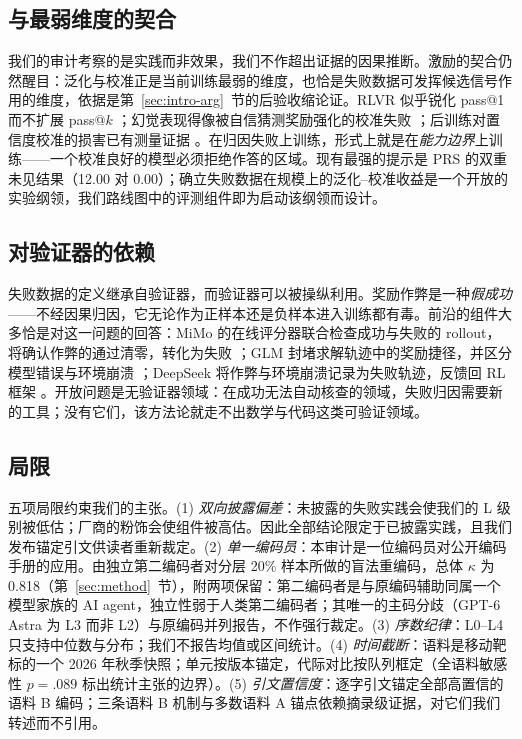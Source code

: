 \documentclass[10pt,fontset=fandol]{ctexart}
\begin{document}
\subsection{与最弱维度的契合}

我们的审计考察的是实践而非效果，我们不作超出证据的因果推断。激励的契合仍然醒目：泛化与校准正是当前训练最弱的维度，也恰是失败数据可发挥候选信号作用的维度，依据是第~\ref{sec:intro-arg}~节的后验收缩论证。RLVR 似乎锐化 pass@1 而不扩展 pass@$k$ \cite{yue2025rlvr}；幻觉表现得像被自信猜测奖励强化的校准失败 \cite{kalai2025halluc}；后训练对置信度校准的损害已有测量证据 \cite{he2023calibration,xie2026know}。在归因失败上训练，形式上就是在\emph{能力边界}上训练——一个校准良好的模型必须拒绝作答的区域。现有最强的提示是 PRS 的双重未见结果（12.00 对 0.00）\cite{hao2026prs}；确立失败数据在规模上的泛化--校准收益是一个开放的实验纲领，我们路线图中的评测组件即为启动该纲领而设计。

\subsection{对验证器的依赖}\label{sec:verifier}

失败数据的定义继承自验证器，而验证器可以被操纵利用。奖励作弊是一种\emph{假成功}——不经因果归因，它无论作为正样本还是负样本进入训练都有毒。前沿的组件大多恰是对这一问题的回答：MiMo 的在线评分器联合检查成功与失败的 rollout，将确认作弊的通过清零，转化为失败 \cite{xiaomi2026mimo}；GLM 封堵求解轨迹中的奖励捷径，并区分模型错误与环境崩溃 \cite{zai2026glm5}；DeepSeek 将作弊与环境崩溃记录为失败轨迹，反馈回 RL 框架 \cite{deepseek2026v41}。开放问题是无验证器领域：在成功无法自动核查的领域，失败归因需要新的工具；没有它们，该方法论就走不出数学与代码这类可验证领域。

\subsection{局限}\label{sec:limitations}

五项局限约束我们的主张。(1) \emph{双向披露偏差}：未披露的失败实践会使我们的 L 级别被低估；厂商的粉饰会使组件被高估。因此全部结论限定于已披露实践，且我们发布锚定引文供读者重新裁定。(2) \emph{单一编码员}：本审计是一位编码员对公开编码手册的应用。由独立第二编码者对分层 20\% 样本所做的盲法重编码，总体 $\kappa$ 为 0.818（第~\ref{sec:method}~节），附两项保留：第二编码者是与原编码辅助同属一个模型家族的 AI agent，独立性弱于人类第二编码者；其唯一的主码分歧（GPT-6 Astra 为 L3 而非 L2）与原编码并列报告，不作强行裁定。(3) \emph{序数纪律}：L0--L4 只支持中位数与分布；我们不报告均值或区间统计。(4) \emph{时间截断}：语料是移动靶标的一个 2026 年秋季快照；单元按版本锚定，代际对比按队列框定（全语料敏感性 $p = .089$ 标出统计主张的边界）。(5) \emph{引文置信度}：逐字引文锚定全部高置信的语料 B 编码；三条语料 B 机制与多数语料 A 锚点依赖摘录级证据，对它们我们转述而不引用。
\end{document}
